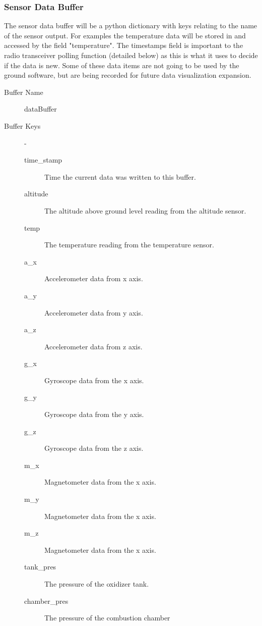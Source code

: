 \documentclass[10pt,draftclsnofoot,onecolumn,compsoc]{IEEEtran}
\begin{document}
\subsubsection{Sensor Data Buffer}
The sensor data buffer will be a python dictionary with keys relating to the name of the sensor output. For examples the temperature data will be stored in and accessed by the field "temperature".  The timestamps field is important to the radio transceiver polling function (detailed below) as this is what it uses to decide if the data is new. Some of these data items are not going to be used by the ground software, but are being recorded for future data visualization expansion.
\begin{description}
	\item[Buffer Name] dataBuffer
	\item[Buffer Keys]  -
		\begin{description}
			\item[time\_stamp] Time the current data was written to this buffer.
			\item[altitude] The altitude above ground level reading from the altitude sensor.
			\item[temp] The temperature reading from the temperature sensor.
			\item[a\_x] Accelerometer data from x axis.
			\item[a\_y] Accelerometer data from y axis.
			\item[a\_z] Accelerometer data from z axis.
			\item[g\_x] Gyroscope data from the x axis.
			\item[g\_y] Gyroscope data from the y axis.
			\item[g\_z] Gyroscope data from the z axis.
			\item[m\_x] Magnetometer data from the x axis.
			\item[m\_y] Magnetometer data from the x axis.
			\item[m\_z] Magnetometer data from the x axis.
			\item[tank\_pres] The pressure of the oxidizer tank.
			\item[chamber\_pres] The pressure of the combustion chamber
		\end{description}
\end{description}
\end{document}
